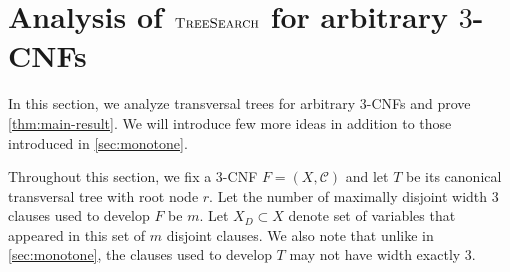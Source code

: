 \documentclass[10pt,a4paper]{article}
\newtheorem{definition}{Definition}
\newcommand{\cC}{\mathcal{C}}
\newcommand{\ts}{\textsc{TreeSearch}}
\begin{document}
%
%

\section{Analysis of $\ts$ for arbitrary $3$-CNFs} \label{sec:non-monotone}



In this section, we analyze transversal trees for arbitrary $3$-CNFs and prove \cref{thm:main-result}. We will introduce few more ideas in addition to those introduced in \cref{sec:monotone}.

Throughout this section, we fix a $3$-CNF $F = (X, \cC)$ and let $T$ be its canonical transversal tree with root node $r$. Let the number of maximally disjoint width $3$ clauses used to develop $F$ be $m$. Let $X_D\subset X$ denote set of variables that appeared in this set of $m$ disjoint clauses. 
We also note that unlike in \cref{sec:monotone}, the clauses used to develop $T$ may not have width exactly $3$.


\end{document}
